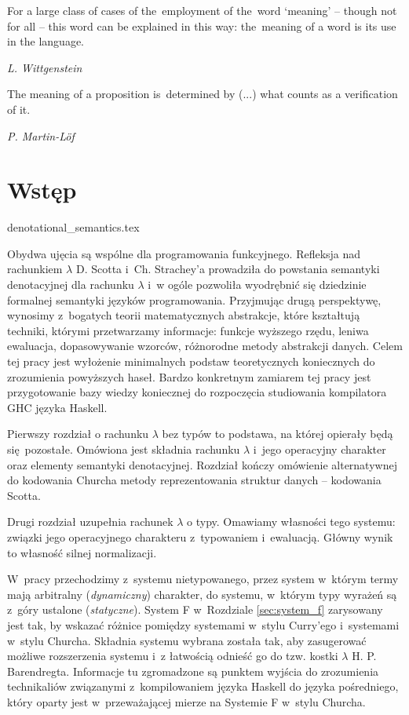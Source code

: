 \epigraph{
For a large class of cases of the~employment of the~word ‘meaning’ -- though not for all -- this word can be explained in this way: the~meaning of a word is its use in the language. \cite{Wittgenstein53}
}{\emph{\small{L. Wittgenstein}}}

\epigraph{The meaning of a proposition is~determined by (...) what counts as a
verification of it. \cite{Lof_96}}{\emph{\small{{P. Martin-Löf}}}}


\section*{Wstęp}
{denotational_semantics.tex}

Obydwa ujęcia są wspólne dla programowania funkcyjnego. Refleksja nad rachunkiem \(\lambda\) D. Scotta i~Ch. Strachey'a prowadziła do powstania semantyki denotacyjnej dla rachunku \(\lambda\) i~w ogóle pozwoliła wyodrębnić się dziedzinie formalnej semantyki języków programowania. Przyjmując drugą perspektywę, wynosimy z~bogatych teorii matematycznych abstrakcje, które kształtują techniki, którymi przetwarzamy informacje: funkcje wyższego rzędu, leniwa ewaluacja, dopasowywanie wzorców, różnorodne metody abstrakcji danych. 
Celem tej pracy jest wyłożenie minimalnych podstaw teoretycznych koniecznych do zrozumienia powyższych haseł. Bardzo konkretnym zamiarem tej pracy jest przygotowanie bazy wiedzy koniecznej do rozpoczęcia studiowania kompilatora GHC języka Haskell.

Pierwszy rozdział o rachunku \(\lambda\) bez typów to podstawa, na której opierały będą się pozostałe. Omówiona jest składnia rachunku \(\lambda\) i~jego operacyjny charakter oraz elementy semantyki denotacyjnej. Rozdział kończy omówienie alternatywnej do kodowania Churcha metody reprezentowania struktur danych -- kodowania Scotta.

Drugi rozdział uzupełnia rachunek \(\lambda\) o typy. Omawiamy własności tego systemu: związki jego operacyjnego charakteru z~typowaniem i~ewaluacją. Główny wynik to własność silnej normalizacji.

W~pracy przechodzimy z~systemu nietypowanego, przez system w~którym termy mają arbitralny (\emph{dynamiczny}) charakter, do systemu, w~którym typy wyrażeń są z~góry ustalone (\emph{statyczne}). System F w~Rozdziale \ref{sec:system_f} zarysowany jest tak, by wskazać różnice pomiędzy systemami w~stylu Curry'ego i~systemami w~stylu Churcha. Składnia systemu wybrana została tak, aby zasugerować możliwe rozszerzenia systemu i~z łatwością odnieść go do tzw. kostki \(\lambda\) H. P. Barendregta. Informacje tu zgromadzone są punktem wyjścia do zrozumienia technikaliów związanymi z~kompilowaniem języka Haskell do języka pośredniego, który oparty jest w~przeważającej mierze na Systemie F w~stylu Churcha. 
